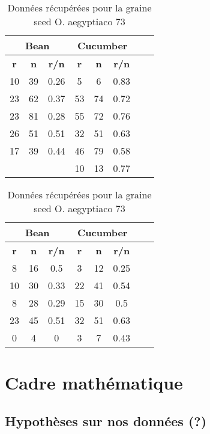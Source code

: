 \documentclass[
]{article}
\begin{document}
\begin{table}[h]
\centering
\small
\begin{minipage}{0.45\textwidth}
\centering
\begin{tabular}{|c|c|c|c|c|c|c|c|}
\hline
\multicolumn{3}{|c|}{\textbf{Bean}} & \multicolumn{3}{|c|}{\textbf{Cucumber}} \\
\hline
\textbf{r} & \textbf{n} & \textbf{r/n} & \textbf{r} & \textbf{n} & \textbf{r/n} \\
\hline
10 & 39 & 0.26 & 5 & 6 & 0.83 \\
23 & 62 & 0.37 & 53 & 74 & 0.72 \\
23 & 81 & 0.28 & 55 & 72 & 0.76 \\
26 & 51 & 0.51 & 32 & 51 & 0.63 \\
17 & 39 & 0.44 & 46 & 79 & 0.58 \\
 & & & 10 & 13 & 0.77 \\
\hline
\end{tabular}
\caption{Données récupérées pour la graine seed O. aegyptiaco 75}
\label{tab:tableau1}
\end{minipage}\hfill
\begin{minipage}{0.45\textwidth}
\centering
\begin{tabular}{|c|c|c|c|c|c|c|c|}
\hline
\multicolumn{3}{|c|}{\textbf{Bean}} & \multicolumn{3}{|c|}{\textbf{Cucumber}} \\
\hline
\textbf{r} & \textbf{n} & \textbf{r/n} & \textbf{r} & \textbf{n} & \textbf{r/n} \\
\hline
8 & 16 & 0.5 & 3 & 12 & 0.25 \\
10 & 30 & 0.33 & 22 & 41 & 0.54 \\
8 & 28 & 0.29 & 15 & 30 & 0.5 \\
23 & 45 & 0.51 & 32 & 51 & 0.63 \\
0 & 4 & 0 & 3 & 7 & 0.43 \\
\hline
\end{tabular}
\caption{Données récupérées pour la graine seed O. aegyptiaco 73}
\label{tab:tableau2}
\end{minipage}
\end{table}

\hypertarget{cadre-mathuxe9matique}{%
\section{Cadre mathématique}\label{cadre-mathuxe9matique}}

\hypertarget{hypothuxe8ses-sur-nos-donnuxe9es}{%
\subsection{Hypothèses sur nos données
(?)}\label{hypothuxe8ses-sur-nos-donnuxe9es}}
\end{document}
